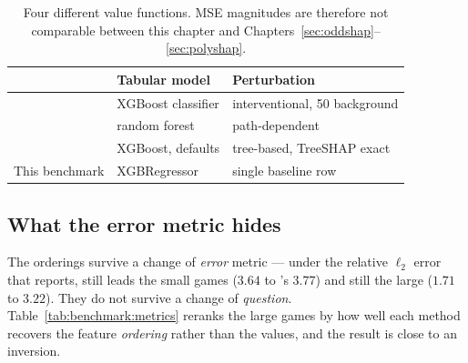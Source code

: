 \begin{table}[H]
    \centering
    \caption[Value functions: three papers and this benchmark]{Four different value functions.
        MSE magnitudes are therefore not comparable between this chapter and
        Chapters~\ref{sec:oddshap}--\ref{sec:polyshap}.}
    \label{tab:benchmark:vfs}
    \begin{tabular}{@{}lll@{}}
        \toprule
        & Tabular model & Perturbation \\
        \midrule
        \oddshap{} \citep{Fumagalli.2026}       & XGBoost classifier & interventional, 50 background \\
        \polyshap{} \citep{Fumagalli.2026a}     & random forest      & path-dependent \\
        \leverageshap{} \citep{Witter.2025a}    & XGBoost, defaults  & tree-based, TreeSHAP exact \\
        This benchmark                          & XGBRegressor       & single baseline row \\
        \bottomrule
    \end{tabular}
\end{table}

\subsection*{What the error metric hides}

The orderings survive a change of \emph{error} metric --- under the relative $\ell_2$ error that
\citet{Witter.2025a} reports, \leverageshap{} still leads the small games ($3.64$ to \polyshap{}'s
$3.77$) and \oddshap{} still the large ($1.71$ to $3.22$). They do not survive a change of
\emph{question}. Table~\ref{tab:benchmark:metrics} reranks the large games by how well each method
recovers the feature \emph{ordering} rather than the values, and the result is close to an
inversion.

